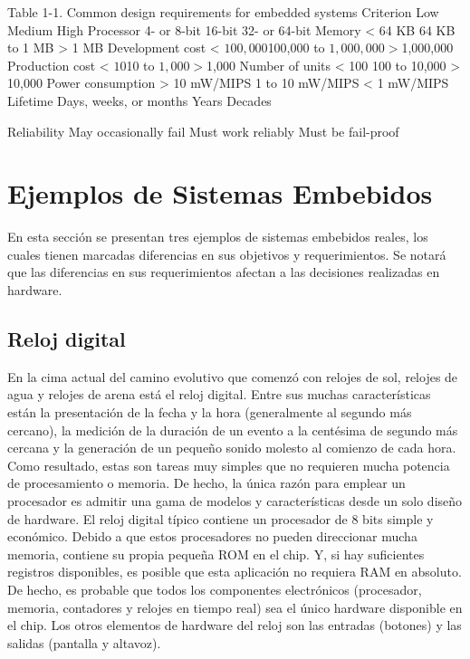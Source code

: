 \documentclass[output=paper, 
colorlinks,
citecolor=brown,
newtxmath
]{langscibook}
\begin{document}
Table 1-1. Common design requirements for embedded systems
Criterion
Low
Medium
High
Processor 4- or 8-bit 16-bit 32- or 64-bit
Memory < 64 KB 64 KB to 1 MB > 1 MB
Development cost < $100,000 $100,000 to $1,000,000 > $1,000,000
Production cost < $10 $10 to $1,000 > $1,000
Number of units < 100 100 to 10,000 > 10,000
Power consumption > 10 mW/MIPS 1 to 10 mW/MIPS < 1 mW/MIPS
Lifetime Days, weeks, or months Years Decades

Reliability May occasionally fail Must work reliably Must be fail-proof




\section {Ejemplos de Sistemas Embebidos}

En esta sección se presentan tres ejemplos de sistemas
embebidos reales, los cuales tienen marcadas
diferencias en sus objetivos y 
requerimientos. Se notará que las diferencias
en sus requerimientos afectan a las decisiones realizadas
en hardware. 

\subsection {Reloj digital}

En la cima actual del camino evolutivo que comenzó con relojes de sol, relojes de agua y relojes de arena está el reloj digital.
Entre sus muchas características están la presentación de la fecha y la hora 
(generalmente al segundo más cercano), la medición de la duración de un evento a la centésima de 
segundo más cercana y la generación de un pequeño sonido molesto al comienzo de cada hora. 
Como resultado, estas son tareas muy simples que no requieren mucha potencia de procesamiento o memoria. 
De hecho, la única razón para emplear un procesador es admitir una gama de modelos y 
características desde un solo diseño de hardware.
El reloj digital típico contiene un procesador de 8 bits simple y económico. Debido a que estos procesadores 
no pueden direccionar mucha memoria, contiene su propia pequeña ROM en el chip. 
Y, si hay suficientes registros disponibles, es posible que esta aplicación 
no requiera RAM en absoluto. De hecho, es probable que todos los componentes 
electrónicos (procesador, memoria, contadores y relojes en tiempo real) sea el único hardware
disponible en el chip.
Los otros elementos de hardware del reloj son las entradas (botones) y las salidas (pantalla y altavoz).
\end{document}

